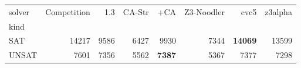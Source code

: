 \begin{tabular}{lrrrrrrr}
\toprule
solver & Competition & \Ostrich{} 1.3 & CA-Str & \Ostrich{}+CA & Z3-Noodler & cvc5 & z3alpha \\
kind &  &  &  &  &  &  &  \\
\midrule
SAT & 14217 & 9586 & 6427 & 9930 & 7344 & \textbf{14069} & 13599 \\
UNSAT & 7601 & 7356 & 5562 & \textbf{7387} & 5367 & 7377 & 7298 \\
\bottomrule
\end{tabular}
